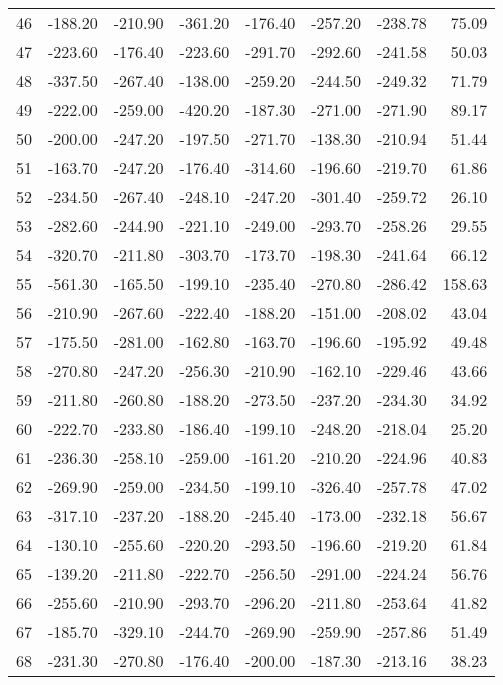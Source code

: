 \begin{longtable}{rrrrrrrr}
46 & -188.20 & -210.90 & -361.20 & -176.40 & -257.20 & -238.78 & 75.09  \\
47 & -223.60 & -176.40 & -223.60 & -291.70 & -292.60 & -241.58 & 50.03  \\
48 & -337.50 & -267.40 & -138.00 & -259.20 & -244.50 & -249.32 & 71.79  \\
49 & -222.00 & -259.00 & -420.20 & -187.30 & -271.00 & -271.90 & 89.17  \\
50 & -200.00 & -247.20 & -197.50 & -271.70 & -138.30 & -210.94 & 51.44  \\
51 & -163.70 & -247.20 & -176.40 & -314.60 & -196.60 & -219.70 & 61.86  \\
52 & -234.50 & -267.40 & -248.10 & -247.20 & -301.40 & -259.72 & 26.10  \\
53 & -282.60 & -244.90 & -221.10 & -249.00 & -293.70 & -258.26 & 29.55  \\
54 & -320.70 & -211.80 & -303.70 & -173.70 & -198.30 & -241.64 & 66.12  \\
55 & -561.30 & -165.50 & -199.10 & -235.40 & -270.80 & -286.42 & 158.63  \\
56 & -210.90 & -267.60 & -222.40 & -188.20 & -151.00 & -208.02 & 43.04  \\
57 & -175.50 & -281.00 & -162.80 & -163.70 & -196.60 & -195.92 & 49.48  \\
58 & -270.80 & -247.20 & -256.30 & -210.90 & -162.10 & -229.46 & 43.66  \\
59 & -211.80 & -260.80 & -188.20 & -273.50 & -237.20 & -234.30 & 34.92  \\
60 & -222.70 & -233.80 & -186.40 & -199.10 & -248.20 & -218.04 & 25.20  \\
61 & -236.30 & -258.10 & -259.00 & -161.20 & -210.20 & -224.96 & 40.83  \\
62 & -269.90 & -259.00 & -234.50 & -199.10 & -326.40 & -257.78 & 47.02  \\
63 & -317.10 & -237.20 & -188.20 & -245.40 & -173.00 & -232.18 & 56.67  \\
64 & -130.10 & -255.60 & -220.20 & -293.50 & -196.60 & -219.20 & 61.84  \\
65 & -139.20 & -211.80 & -222.70 & -256.50 & -291.00 & -224.24 & 56.76  \\
66 & -255.60 & -210.90 & -293.70 & -296.20 & -211.80 & -253.64 & 41.82  \\
67 & -185.70 & -329.10 & -244.70 & -269.90 & -259.90 & -257.86 & 51.49  \\
68 & -231.30 & -270.80 & -176.40 & -200.00 & -187.30 & -213.16 & 38.23  \\

\end{longtable}

